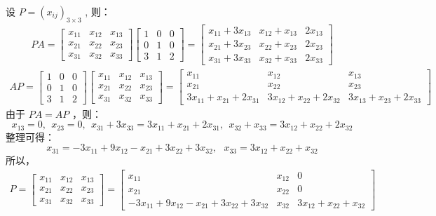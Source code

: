 \documentclass[11pt,a4paper,openany,oneside]{book}
\begin{document}
设 $ P = (x_{ij})_{3\times3} $ , 则：
\begin{gather*}
PA = 
\begin{bmatrix}
x_{11} & x_{12} & x_{13} \\
x_{21} & x_{22} & x_{23} \\
x_{31} & x_{32} & x_{33} 
\end{bmatrix} 
\begin{bmatrix}
1 & 0 & 0 \\
0 & 1 & 0 \\
3 & 1 & 2 
\end{bmatrix}
=
\begin{bmatrix}
x_{11} + 3x_{13} & x_{12} + x_{13} & 2x_{13} \\
x_{21} + 3x_{23} & x_{22} + x_{23} & 2x_{23} \\
x_{31} + 3x_{33} & x_{32} + x_{33} & 2x_{33}
\end{bmatrix}
\end{gather*}
\begin{gather*}
AP = 
\begin{bmatrix}
1 & 0 & 0 \\
0 & 1 & 0 \\
3 & 1 & 2 
\end{bmatrix}
\begin{bmatrix}
x_{11} & x_{12} & x_{13} \\
x_{21} & x_{22} & x_{23} \\
x_{31} & x_{32} & x_{33} 
\end{bmatrix} 
=
\begin{bmatrix}
x_{11} & x_{12} & x_{13} \\
x_{21} & x_{22} & x_{23} \\
3x_{11} + x_{21} + 2x_{31} & 3x_{12} + x_{22} + 2x_{32} & 3x_{13} + x_{23} + 2x_{33}
\end{bmatrix}
\end{gather*}
由于 $ PA = AP $ ，则：
 $$  x_{13} = 0, \ \ x_{23} = 0, \ \ x_{31}+3x_{33} = 3x_{11} + x_{21} + 2x_{31}, \ \ x_{32} + x_{33} = 3x_{12} + x_{22} + 2x_{32}  $$ 
整理可得：
 $$  x_{31} = -3x_{11} +  9x_{12} -x_{21} + 3x_{22} + 3x_{32}, \ \ \ x_{33} = 3x_{12} + x_{22} + x_{32}  $$ 
所以，
\begin{gather*}
P = 
\begin{bmatrix}
x_{11} & x_{12} & x_{13} \\
x_{21} & x_{22} & x_{23}\\
x_{31} & x_{32} & x_{33}
\end{bmatrix}
=
\begin{bmatrix}
x_{11} & x_{12} & 0 \\
x_{21} & x_{22} & 0\\
-3x_{11} +  9x_{12} -x_{21} + 3x_{22} + 3x_{32} & x_{32} & 3x_{12} + x_{22} + x_{32}
\end{bmatrix} 
\end{gather*}
\end{document}
